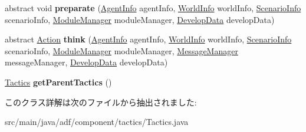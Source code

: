 \begin{DoxyCompactItemize}
\item 
\hypertarget{classadf_1_1component_1_1tactics_1_1Tactics_ad553c6f61e207d2f52900a9f84b9a1af}{}\label{classadf_1_1component_1_1tactics_1_1Tactics_ad553c6f61e207d2f52900a9f84b9a1af} 
abstract void {\bfseries preparate} (\hyperlink{classadf_1_1agent_1_1info_1_1AgentInfo}{Agent\+Info} agent\+Info, \hyperlink{classadf_1_1agent_1_1info_1_1WorldInfo}{World\+Info} world\+Info, \hyperlink{classadf_1_1agent_1_1info_1_1ScenarioInfo}{Scenario\+Info} scenario\+Info, \hyperlink{classadf_1_1agent_1_1module_1_1ModuleManager}{Module\+Manager} module\+Manager, \hyperlink{classadf_1_1agent_1_1develop_1_1DevelopData}{Develop\+Data} develop\+Data)
\item 
\hypertarget{classadf_1_1component_1_1tactics_1_1Tactics_a696ecad03db5a993c63ef8bfb082297b}{}\label{classadf_1_1component_1_1tactics_1_1Tactics_a696ecad03db5a993c63ef8bfb082297b} 
abstract \hyperlink{classadf_1_1agent_1_1action_1_1Action}{Action} {\bfseries think} (\hyperlink{classadf_1_1agent_1_1info_1_1AgentInfo}{Agent\+Info} agent\+Info, \hyperlink{classadf_1_1agent_1_1info_1_1WorldInfo}{World\+Info} world\+Info, \hyperlink{classadf_1_1agent_1_1info_1_1ScenarioInfo}{Scenario\+Info} scenario\+Info, \hyperlink{classadf_1_1agent_1_1module_1_1ModuleManager}{Module\+Manager} module\+Manager, \hyperlink{classadf_1_1agent_1_1communication_1_1MessageManager}{Message\+Manager} message\+Manager, \hyperlink{classadf_1_1agent_1_1develop_1_1DevelopData}{Develop\+Data} develop\+Data)
\item 
\hypertarget{classadf_1_1component_1_1tactics_1_1Tactics_a66da6efad00dd811eeaa860221272037}{}\label{classadf_1_1component_1_1tactics_1_1Tactics_a66da6efad00dd811eeaa860221272037} 
\hyperlink{classadf_1_1component_1_1tactics_1_1Tactics}{Tactics} {\bfseries get\+Parent\+Tactics} ()
\end{DoxyCompactItemize}


このクラス詳解は次のファイルから抽出されました\+:\begin{DoxyCompactItemize}
\item 
src/main/java/adf/component/tactics/Tactics.\+java\end{DoxyCompactItemize}
